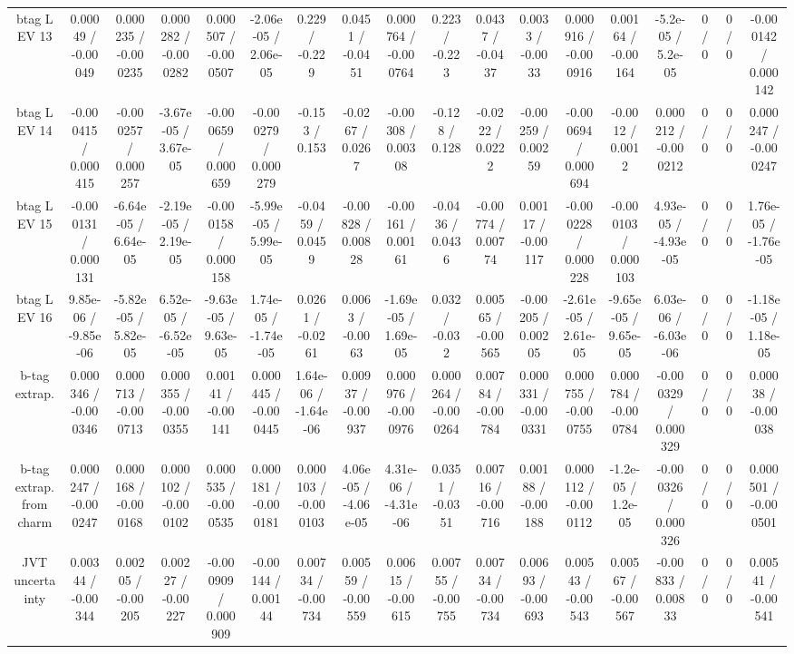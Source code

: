 \documentclass[10pt]{article}
\begin{document}
\begin{table}[htbp]
\begin{center}
\begin{tabular}{|c|c|c|c|c|c|c|c|c|c|c|c|c|c|c|c|c|c|}
  btag L EV 13 & 0.00049 / -0.00049 & 0.000235 / -0.000235 & 0.000282 / -0.000282 & 0.000507 / -0.000507 & -2.06e-05 / 2.06e-05 & 0.229 / -0.229 & 0.0451 / -0.0451 & 0.000764 / -0.000764 & 0.223 / -0.223 & 0.0437 / -0.0437 & 0.0033 / -0.0033 & 0.000916 / -0.000916 & 0.00164 / -0.00164 & -5.2e-05 / 5.2e-05 & 0 / 0 & 0 / 0 & -0.000142 / 0.000142 \\ 
  btag L EV 14 & -0.000415 / 0.000415 & -0.000257 / 0.000257 & -3.67e-05 / 3.67e-05 & -0.000659 / 0.000659 & -0.000279 / 0.000279 & -0.153 / 0.153 & -0.0267 / 0.0267 & -0.00308 / 0.00308 & -0.128 / 0.128 & -0.0222 / 0.0222 & -0.00259 / 0.00259 & -0.000694 / 0.000694 & -0.0012 / 0.0012 & 0.000212 / -0.000212 & 0 / 0 & 0 / 0 & 0.000247 / -0.000247 \\ 
  btag L EV 15 & -0.000131 / 0.000131 & -6.64e-05 / 6.64e-05 & -2.19e-05 / 2.19e-05 & -0.000158 / 0.000158 & -5.99e-05 / 5.99e-05 & -0.0459 / 0.0459 & -0.00828 / 0.00828 & -0.00161 / 0.00161 & -0.0436 / 0.0436 & -0.00774 / 0.00774 & 0.00117 / -0.00117 & -0.000228 / 0.000228 & -0.000103 / 0.000103 & 4.93e-05 / -4.93e-05 & 0 / 0 & 0 / 0 & 1.76e-05 / -1.76e-05 \\ 
  btag L EV 16 & 9.85e-06 / -9.85e-06 & -5.82e-05 / 5.82e-05 & 6.52e-05 / -6.52e-05 & -9.63e-05 / 9.63e-05 & 1.74e-05 / -1.74e-05 & 0.0261 / -0.0261 & 0.0063 / -0.0063 & -1.69e-05 / 1.69e-05 & 0.032 / -0.032 & 0.00565 / -0.00565 & -0.00205 / 0.00205 & -2.61e-05 / 2.61e-05 & -9.65e-05 / 9.65e-05 & 6.03e-06 / -6.03e-06 & 0 / 0 & 0 / 0 & -1.18e-05 / 1.18e-05 \\ 
  b-tag extrap. & 0.000346 / -0.000346 & 0.000713 / -0.000713 & 0.000355 / -0.000355 & 0.00141 / -0.00141 & 0.000445 / -0.000445 & 1.64e-06 / -1.64e-06 & 0.00937 / -0.00937 & 0.000976 / -0.000976 & 0.000264 / -0.000264 & 0.00784 / -0.00784 & 0.000331 / -0.000331 & 0.000755 / -0.000755 & 0.000784 / -0.000784 & -0.000329 / 0.000329 & 0 / 0 & 0 / 0 & 0.00038 / -0.00038 \\ 
  b-tag extrap. from charm & 0.000247 / -0.000247 & 0.000168 / -0.000168 & 0.000102 / -0.000102 & 0.000535 / -0.000535 & 0.000181 / -0.000181 & 0.000103 / -0.000103 & 4.06e-05 / -4.06e-05 & 4.31e-06 / -4.31e-06 & 0.0351 / -0.0351 & 0.00716 / -0.00716 & 0.00188 / -0.00188 & 0.000112 / -0.000112 & -1.2e-05 / 1.2e-05 & -0.000326 / 0.000326 & 0 / 0 & 0 / 0 & 0.000501 / -0.000501 \\ 
  JVT uncertainty & 0.00344 / -0.00344 & 0.00205 / -0.00205 & 0.00227 / -0.00227 & -0.000909 / 0.000909 & -0.00144 / 0.00144 & 0.00734 / -0.00734 & 0.00559 / -0.00559 & 0.00615 / -0.00615 & 0.00755 / -0.00755 & 0.00734 / -0.00734 & 0.00693 / -0.00693 & 0.00543 / -0.00543 & 0.00567 / -0.00567 & -0.00833 / 0.00833 & 0 / 0 & 0 / 0 & 0.00541 / -0.00541 \\ 

\end{tabular}
\end{center}
\end{table}
\end{document}
